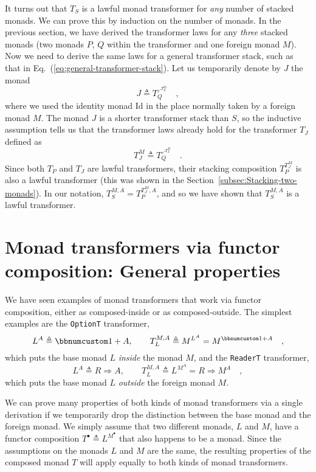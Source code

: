 It turns out that $T_{S}$ is a lawful monad transformer for \emph{any}
number of stacked monads. We can prove this by induction on the number
of monads. In the previous section, we have derived the transformer
laws for any \emph{three} stacked monads (two monads $P$, $Q$ within
the transformer and one foreign monad $M$). Now we need to derive
the same laws for a general transformer stack, such as that in Eq.~(\ref{eq:general-transformer-stack}).
Let us temporarily denote by $J$ the monad 
\[
J\triangleq T_{Q}^{\iddots^{T_{Z}^{\text{Id}}}}\quad,
\]
where we used the identity monad $\text{Id}$ in the place normally
taken by a foreign monad $M$. The monad $J$ is a shorter transformer
stack than $S$, so the inductive assumption tells us that the transformer
laws already hold for the transformer $T_{J}$ defined as
\[
T_{J}^{M}\triangleq T_{Q}^{\iddots^{T_{Z}^{M}}}\quad.
\]
Since both $T_{P}$ and $T_{J}$ are lawful transformers, their stacking
composition $T_{P}^{T_{J}^{M}}$ is also a lawful transformer (this
was shown in the Section~\ref{subsec:Stacking-two-monads}). In our
notation, $T_{S}^{M,A}=T_{P}^{T_{J}^{M},A}$, and so we have shown
that $T_{S}^{M,A}$ is a lawful transformer.

\section{Monad transformers via functor composition: General properties\label{sec:Monad-transformers-that-use-composition}}

We have seen examples of monad transformers that work via functor
composition, either as composed-inside or as composed-outside. The
simplest examples are the \lstinline!OptionT!
transformer,
\[
L^{A}\triangleq\bbnum 1+A,\quad\quad T_{L}^{M,A}\triangleq M^{L^{A}}=M^{\bbnum 1+A}\quad,
\]
which puts the base monad $L$ \emph{inside} the monad $M$, and the
\lstinline!ReaderT! transformer,
\[
L^{A}\triangleq R\Rightarrow A,\quad\quad T_{L}^{M,A}\triangleq L^{M^{A}}=R\Rightarrow M^{A}\quad,
\]
which puts the base monad $L$ \emph{outside} the foreign monad $M$. 

We can prove many properties of both kinds of monad transformers via
a single derivation if we temporarily drop the distinction between
the base monad and the foreign monad. We simply assume that two different
monads, $L$ and $M$, have a functor composition $T^{\bullet}\triangleq L^{M^{\bullet}}$
that also happens to be a monad. Since the assumptions on the monads
$L$ and $M$ are the same, the resulting properties of the composed
monad $T$ will apply equally to both kinds of monad transformers.

